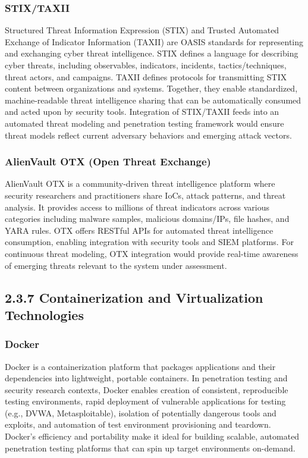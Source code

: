 \documentclass[12pt,a4paper]{report}
\begin{document}
\subsubsection{STIX/TAXII}

Structured Threat Information Expression (STIX) and Trusted Automated Exchange of Indicator Information (TAXII) are OASIS standards for representing and exchanging cyber threat intelligence. STIX defines a language for describing cyber threats, including observables, indicators, incidents, tactics/techniques, threat actors, and campaigns. TAXII defines protocols for transmitting STIX content between organizations and systems. Together, they enable standardized, machine-readable threat intelligence sharing that can be automatically consumed and acted upon by security tools. Integration of STIX/TAXII feeds into an automated threat modeling and penetration testing framework would ensure threat models reflect current adversary behaviors and emerging attack vectors.

\subsubsection{AlienVault OTX (Open Threat Exchange)}

AlienVault OTX is a community-driven threat intelligence platform where security researchers and practitioners share IoCs, attack patterns, and threat analysis. It provides access to millions of threat indicators across various categories including malware samples, malicious domains/IPs, file hashes, and YARA rules. OTX offers RESTful APIs for automated threat intelligence consumption, enabling integration with security tools and SIEM platforms. For continuous threat modeling, OTX integration would provide real-time awareness of emerging threats relevant to the system under assessment.

\subsection{2.3.7 Containerization and Virtualization Technologies}

\subsubsection{Docker}

Docker is a containerization platform that packages applications and their dependencies into lightweight, portable containers. In penetration testing and security research contexts, Docker enables creation of consistent, reproducible testing environments, rapid deployment of vulnerable applications for testing (e.g., DVWA, Metasploitable), isolation of potentially dangerous tools and exploits, and automation of test environment provisioning and teardown. Docker's efficiency and portability make it ideal for building scalable, automated penetration testing platforms that can spin up target environments on-demand.
\end{document}
